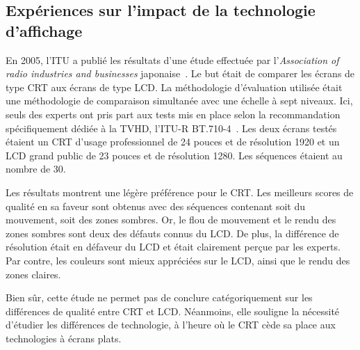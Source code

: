 \subsection{Expériences sur l'impact de la technologie d'affichage} \label{ssec:itu}
En 2005, l'ITU a publié les résultats d'une étude effectuée par l'\emph{Association of radio industries and businesses} japonaise~\cite{itu-crtlcd}. Le but était de comparer les écrans de type CRT aux écrans de type LCD. La méthodologie d'évaluation utilisée était une méthodologie de comparaison simultanée avec une échelle à sept niveaux. Ici, seuls des experts ont pris part aux tests mis en place selon la recommandation spécifiquement dédiée à la TVHD, l'ITU-R BT.710-4~\cite{itu-bt710-4}. Les deux écrans testés étaient un CRT d'usage professionnel de 24 pouces et de résolution 1920 et un LCD grand public de 23 pouces et de résolution 1280. Les séquences étaient au nombre de 30.

Les résultats montrent une légère préférence pour le CRT. Les meilleurs scores de qualité en sa faveur sont obtenus avec des séquences contenant soit du mouvement, soit des zones sombres. Or, le flou de mouvement et le rendu des zones sombres sont deux des défauts connus du LCD. De plus, la différence de résolution était en défaveur du LCD et était clairement perçue par les experts. Par contre, les couleurs sont mieux appréciées sur le LCD, ainsi que le rendu des zones claires.

Bien sûr, cette étude ne permet pas de conclure catégoriquement sur les différences de qualité entre CRT et LCD. Néanmoins, elle souligne la nécessité d'étudier les différences de technologie, à l'heure où le CRT cède sa place aux technologies à écrans plats.


